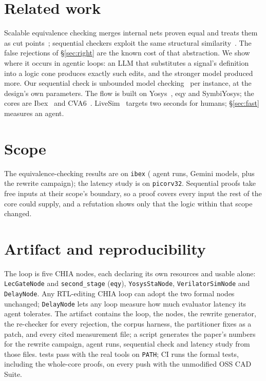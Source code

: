 \documentclass[sigconf,nonacm]{acmart}
\begin{document}
\section{Related work}

Scalable equivalence checking merges internal nets proven equal and treats them
as cut points~\cite{kuehlmann}; sequential checkers exploit the same structural
similarity~\cite{vaneijk}. The false rejections of \S\ref{sec:right} are the
known cost of that abstraction. We show where it occurs in agentic loops: an LLM
that substitutes a signal's definition into a logic cone produces exactly such
edits, and the stronger model produced more. Our sequential check is
unbounded model checking~\cite{bradley,een} per instance, at the design's own
parameters. The flow is built on Yosys~\cite{yosys}, eqy and SymbiYosys; the
cores are Ibex~\cite{ibex} and CVA6~\cite{cva6}. LiveSim~\cite{livesim} targets
two seconds for humans; \S\ref{sec:fast} measures an agent.

\section{Scope}

The equivalence-checking results are on \texttt{ibex} (\ABruns{} agent runs,
\ABmodels{} Gemini models, plus the rewrite campaign); the latency study is on
\texttt{picorv32}. Sequential proofs take free inputs at their scope's boundary,
so a proof covers every input the rest of the core could supply, and a
refutation shows only that the logic within that scope changed.

\section{Artifact and reproducibility}

The loop is five CHIA nodes, each declaring its own resources and usable
alone: \texttt{LecGateNode} and \texttt{second\_stage}
(\texttt{eqy}), \texttt{YosysStaNode}, \texttt{VerilatorSimNode} and
\texttt{DelayNode}. Any RTL-editing CHIA loop can adopt the two formal nodes
unchanged; \texttt{DelayNode} lets any loop measure how much evaluator latency
its agent tolerates. The artifact contains the loop, the nodes, the rewrite
generator, the re-checker for every rejection, the corpus harness, the
partitioner fixes as a patch, and every cited measurement file; a script
generates the paper's numbers for the rewrite campaign, agent runs, sequential
check and latency study from those files. \TESTS{} tests pass with the real
tools on \texttt{PATH}; CI runs the formal tests, including the whole-core proofs, on every push with the unmodified OSS
CAD Suite.
\end{document}
